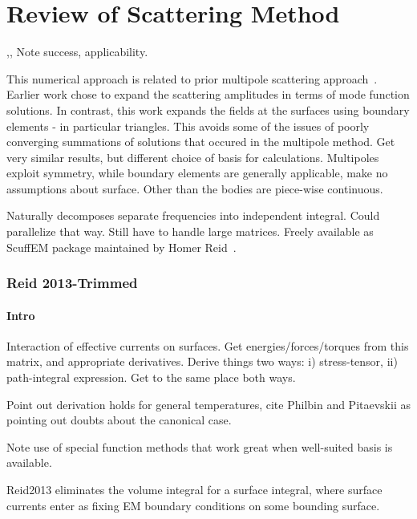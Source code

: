 \chapter{Review of Scattering Method}

\cite{Reid2009},\cite{Reid2011}, \cite{Reid2013} 
Note success, applicability.  

This numerical approach is related to prior multipole scattering approach~\cite{Rahi2009}.
Earlier work chose to expand the scattering amplitudes in terms of mode function
solutions.  In contrast, this work expands the fields at the surfaces using 
boundary elements - in particular triangles.  
This avoids some of the issues of poorly converging summations of solutions that occured in
the multipole method.  Get very similar results, but different choice of basis for calculations.
Multipoles exploit symmetry, while boundary elements are generally applicable, make no assumptions 
about surface.  Other than the bodies are piece-wise continuous.  

Naturally decomposes separate frequencies into independent integral.  Could parallelize that way.
Still have to handle large matrices.  Freely available as ScuffEM package maintained by
 Homer Reid~\cite{ScuffEM2016}.  

\subsection{Reid 2013-Trimmed}

\subsubsection{Intro}

Interaction of effective currents on surfaces.  Get energies/forces/torques from
this matrix, and appropriate derivatives.  Derive things two ways:
i) stress-tensor, ii) path-integral expression.  Get to the same place both ways.  

Point out derivation holds for general temperatures, cite Philbin and Pitaevskii
as pointing out doubts about the canonical case.  

Note use of special function methods that work great when well-suited basis is 
available.  

Reid2013 eliminates the volume integral for a surface integral, where surface currents
enter as fixing EM boundary conditions on some bounding surface.    

